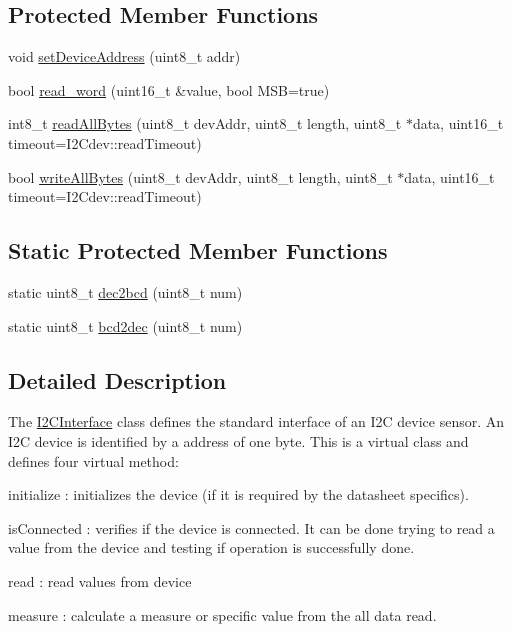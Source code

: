\subsection*{Protected Member Functions}
\begin{DoxyCompactItemize}
\item 
void \hyperlink{classsmrtobj_1_1i2c_1_1_i2_c_interface_aa4943f672d4cd56cfff8db8837c31824}{set\+Device\+Address} (uint8\+\_\+t addr)
\item 
bool \hyperlink{classsmrtobj_1_1i2c_1_1_i2_c_interface_a4692eedeaa640e42dbba829776b6646b}{read\+\_\+word} (uint16\+\_\+t \&value, bool M\+S\+B=true)
\item 
int8\+\_\+t \hyperlink{classsmrtobj_1_1i2c_1_1_i2_c_interface_acd7cd03741b455e1d48bb3e7da303bff}{read\+All\+Bytes} (uint8\+\_\+t dev\+Addr, uint8\+\_\+t length, uint8\+\_\+t $\ast$data, uint16\+\_\+t timeout=I2\+Cdev\+::read\+Timeout)
\item 
bool \hyperlink{classsmrtobj_1_1i2c_1_1_i2_c_interface_a64635dd37a944047ca793740ec1473f0}{write\+All\+Bytes} (uint8\+\_\+t dev\+Addr, uint8\+\_\+t length, uint8\+\_\+t $\ast$data, uint16\+\_\+t timeout=I2\+Cdev\+::read\+Timeout)
\end{DoxyCompactItemize}
\subsection*{Static Protected Member Functions}
\begin{DoxyCompactItemize}
\item 
static uint8\+\_\+t \hyperlink{classsmrtobj_1_1i2c_1_1_i2_c_interface_a56a637f360d7194e90fb1c7a6b5dd616}{dec2bcd} (uint8\+\_\+t num)
\item 
static uint8\+\_\+t \hyperlink{classsmrtobj_1_1i2c_1_1_i2_c_interface_a32d47650f01b2342e3f39639f643baf2}{bcd2dec} (uint8\+\_\+t num)
\end{DoxyCompactItemize}


\subsection{Detailed Description}
The \hyperlink{classsmrtobj_1_1i2c_1_1_i2_c_interface}{I2\+C\+Interface} class defines the standard interface of an I2\+C device sensor. An I2\+C device is identified by a address of one byte. This is a virtual class and defines four virtual method\+:
\begin{DoxyItemize}
\item initialize \+: initializes the device (if it is required by the datasheet specifics).
\item is\+Connected \+: verifies if the device is connected. It can be done trying to read a value from the device and testing if operation is successfully done.
\item read \+: read values from device
\item measure \+: calculate a measure or specific value from the all data read. 
\end{DoxyItemize}

